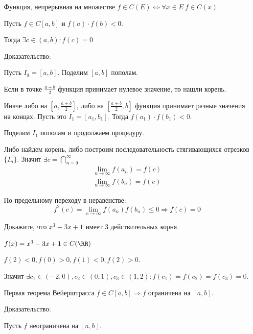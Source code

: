 \begin{defn}{Функция, непрерывная на множестве}{}
    \( f \in C(E) \Leftrightarrow \forall x \in E \ f \in C(x) \)
\end{defn}

\begin{thrm}{}{}
    Пусть \( f \in C[a, b] \) и \( f(a) \cdot f(b) < 0 \).

    Тогда \( \exists c \in (a, b) : f(c) = 0 \)
\end{thrm}

Доказательство:

Пусть \( I_0 = [a, b] \).
Поделим \( [a, b] \) пополам.

Если в точке \( \frac{a + b}{2} \) функция принимает нулевое значение, то нашли корень.

Иначе либо на \( [a, \frac{a + b}{2}] \), либо на \( [\frac{a + b}{2}, b] \)
функция принимает разные значения на концах.
Пусть это \( I_1 = [a_1, b_1] \).
Тогда \( f(a_1) \cdot f(b_1) < 0 \).

Поделим \( I_1 \) пополам и продолжаем процедуру.

Либо найдем корень, либо построим последовательность стягивающихся отрезков \( \{ I_n \} \).
Значит \( \exists c = \bigcap\limits_{n = 0}^\infty \)
\begin{gather*}
    \lim\limits_{n \to \infty} f(a_n) = f(c)
    \\
    \lim\limits_{n \to \infty} f(b_n) = f(c)
\end{gather*}

По предельному переходу в неравенстве:
\[
    f^2(c) = \lim\limits_{n \to \infty} f(a_n) f(b_n) \leq 0 \Rightarrow f(c) = 0
\]

\begin{example}{}{}
    Докажите, что \( x^3 - 3x + 1 \) имеет \( 3 \) действительных корня.
\end{example}

\( f(x) = x^3 - 3x + 1 \in C(\RR) \)

\( f(2) < 0, f(0) > 0, f(1) < 0, f(2) > 0 \).

Значит \( \exists c_1 \in (-2, 0), c_2 \in (0, 1), c_3 \in (1, 2) : f(c_1) = f(c_2) = f(c_3) = 0 \).

\begin{thrm}{Первая теорема Вейерштрасса}{}
    \( f \in C[a, b] \Rightarrow f \) ограничена на \( [a, b] \).
\end{thrm}

Доказательство:

Пусть \( f \) неограничена на \( [a, b] \).

